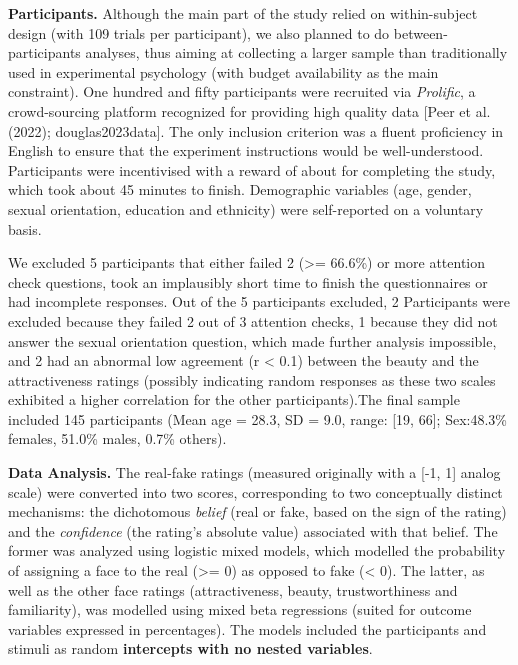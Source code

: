 \documentclass[
  man,
  floatsintext,
  longtable,
  nolmodern,
  notxfonts,
  notimes,
  colorlinks=true,linkcolor=blue,citecolor=blue,urlcolor=blue]{apa7}
\begin{document}
\textbf{Participants.} Although the main part of the study relied on
within-subject design (with 109 trials per participant), we also planned
to do between-participants analyses, thus aiming at collecting a larger
sample than traditionally used in experimental psychology (with budget
availability as the main constraint). One hundred and fifty participants
were recruited via \emph{Prolific}, a crowd-sourcing platform recognized
for providing high quality data {[}Peer et al. (2022);
douglas2023data{]}. The only inclusion criterion was a fluent
proficiency in English to ensure that the experiment instructions would
be well-understood. Participants were incentivised with a reward of
about  for completing the study, which took about 45
minutes to finish. Demographic variables (age, gender, sexual
orientation, education and ethnicity) were self-reported on a voluntary
basis.

We excluded 5 participants that either failed 2 (\textgreater= 66.6\%)
or more attention check questions, took an implausibly short time to
finish the questionnaires or had incomplete responses. Out of the 5
participants excluded, 2 Participants were excluded because they failed
2 out of 3 attention checks, 1 because they did not answer the sexual
orientation question, which made further analysis impossible, and 2 had
an abnormal low agreement (r \textless{} 0.1) between the beauty and the
attractiveness ratings (possibly indicating random responses as these
two scales exhibited a higher correlation for the other
participants).The final sample included 145 participants (Mean age =
28.3, SD = 9.0, range: {[}19, 66{]}; Sex:48.3\% females, 51.0\% males,
0.7\% others).

\textbf{Data Analysis.} The real-fake ratings (measured originally with
a {[}-1, 1{]} analog scale) were converted into two scores,
corresponding to two conceptually distinct mechanisms: the dichotomous
\emph{belief} (real or fake, based on the sign of the rating) and the
\emph{confidence} (the rating's absolute value) associated with that
belief. The former was analyzed using logistic mixed models, which
modelled the probability of assigning a face to the real (\textgreater=
0) as opposed to fake (\textless{} 0). The latter, as well as the other
face ratings (attractiveness, beauty, trustworthiness and familiarity),
was modelled using mixed beta regressions (suited for outcome variables
expressed in percentages). The models included the participants and
stimuli as random \textbf{intercepts with no nested variables}.
\end{document}
